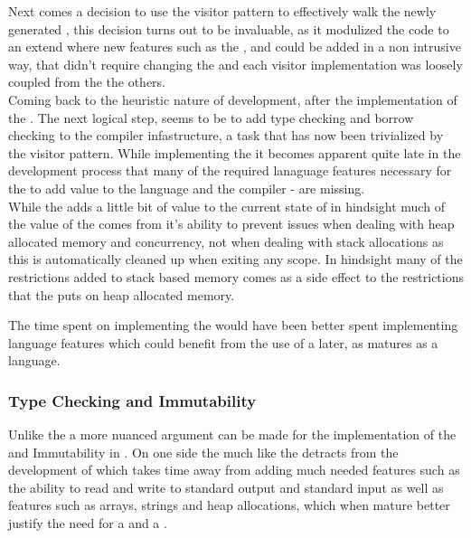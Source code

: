 Next comes a decision to use the visitor pattern to effectively walk the newly
generated \ast{}, this decision turns out to be invaluable, as it modulized the code
to an extend where new features such as the \typeChecker, \borrowChecker{} and
\codeGen{} could be added in a non intrusive way, that didn't require changing the
\ast{} and each visitor implementation was loosely coupled from the the others. \\

Coming back to the heuristic nature of development, after the implementation of the
\codeGen. The next logical step, seems to be to add type checking and borrow checking
to the compiler infastructure, a task that has now been trivialized by the visitor
pattern. While implementing the \borrowChecker{} it becomes apparent quite late in
the development process that many of the required lanaguage features necessary for
the \borrowChecker{} to add value to the language and the compiler - are missing. \\

While the \borrowChecker{} adds a little bit of value to the current state of \lang{}
in hindsight much of the value of the \borrowChecker{} comes from it's ability to
prevent issues when dealing with heap allocated memory and concurrency, not when
dealing with stack allocations as this is automatically cleaned up when exiting any
scope. In hindsight many of the restrictions added to stack based memory comes as a side
effect to the restrictions that the \borrowChecker{} puts on heap allocated memory. 

The time spent on implementing the \borrowChecker{} would have been better
spent implementing language features which could benefit from the use of a
\borrowChecker{} later, as \lang{} matures as a language.

\subsubsection{Type Checking and Immutability}

Unlike the \borrowChecker{} a more nuanced argument can be made for the
implementation of the \typeChecker{} and Immutability in \lang. On one side the
\typeChecker{} much like the \borrowChecker{} detracts from the development of
\lang{} which takes time away from adding much needed features such as the ability
to read and write to standard output and standard input as well as features such as
arrays, strings and heap allocations, which when mature better justify the need for a
\typeChecker{} and a \borrowChecker. \\ 


